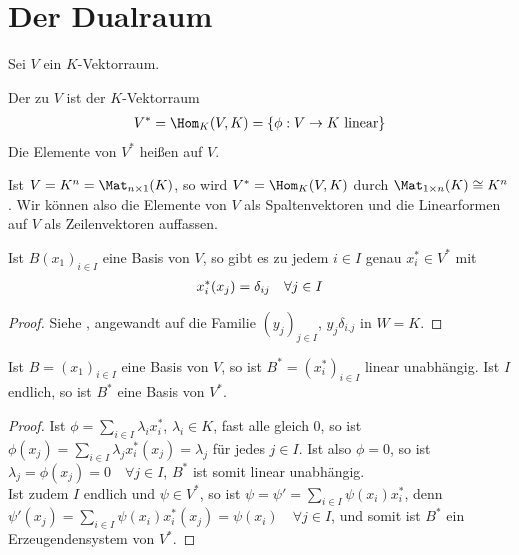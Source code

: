 \section{Der Dualraum}

Sei $V$ ein $K$-Vektorraum.

\begin{definition}[Dualraum]
	Der  zu $V$ ist der $K$-Vektorraum
	\begin{align}
		V^*=\Hom_K(V,K)=\{\phi:V\to K\text{ linear}\}\notag
	\end{align}
	Die Elemente von $V^*$ heißen  auf $V$.
\end{definition}

\begin{example}
	Ist $V=K^n=\Mat_{n\times 1}(K)$, so wird $V^*=\Hom_K(V,K)$ durch $\Mat_{1\times n}(K)\cong K^n$. Wir können also die Elemente von $V$ als Spaltenvektoren und die Linearformen auf $V$ als Zeilenvektoren auffassen.
\end{example}

\begin{lemma}
	Ist $B(x_1)_{i\in I}$ eine Basis von $V$, so gibt es zu jedem $i\in I$ genau $x_i^*\in V^*$ mit 
	\begin{align}
		x_i^*(x_j)=\delta_{ij}\quad\forall j\in I\notag
	\end{align}
\end{lemma}
\begin{proof}
	Siehe , angewandt auf die Familie $(y_j)_{j\in I}$, $y_j\delta_{i.j}$ in $W=K$.
\end{proof}

\begin{proposition}
	Ist $B=(x_1)_{i\in I}$ eine Basis von $V$, so ist $B^*=(x_i^*)_{i\in I}$ linear unabhängig. Ist $I$ endlich, so ist $B^*$ eine Basis von $V^*$.
\end{proposition}
\begin{proof}
	Ist $\phi=\sum_{i\in I} \lambda_ix_i^*$, $\lambda_i\in K$, fast alle gleich 0, so ist $\phi(x_j)=\sum_{i\in I} \lambda_j x_i^*(x_j)=\lambda_j$ für jedes $j\in I$. Ist also $\phi=0$, so ist $\lambda_j=\phi(x_j)=0\quad\forall j\in I$, $B^*$ ist somit linear unabhängig. \\
	Ist zudem $I$ endlich und $\psi\in V^*$, so ist $\psi=\psi'=\sum_{i\in I} \psi(x_i)x_i^*$, denn $\psi'(x_j)=\sum_{i\in I} \psi(x_i)x_i^*(x_j)=\psi(x_i)\quad\forall j\in I$, und somit ist $B^*$ ein Erzeugendensystem von $V^*$.
\end{proof}

